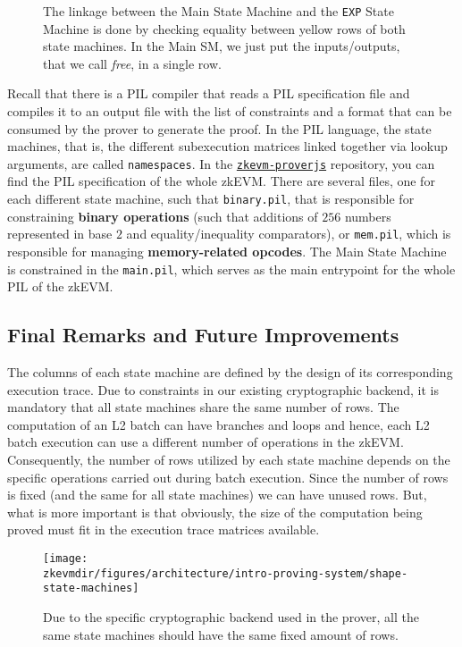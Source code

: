 \begin{figure}[ht]
\caption{The linkage between the Main State Machine and the \texttt{EXP} State Machine is done by checking equality between yellow rows of both state machines. In the Main SM, we just put the inputs/outputs, that we call \textit{free}, in a single row.}
\label{fig:lookup-exp}

\end{figure}

Recall that there is a PIL compiler that reads a PIL specification file and compiles it to an output file with the list of constraints and a format that can be consumed by the prover to generate the proof. In the PIL language, the state machines, that is, the different subexecution matrices linked together via lookup arguments, are called \texttt{namespaces}. In the \href{https://github.com/0xPolygonHermez/zkevm-proverjs}{\texttt{zkevm-proverjs}} repository, you can find the PIL specification of the whole zkEVM. There are several files, one for each different state machine, such that \texttt{binary.pil}, that is responsible for constraining \textbf{binary operations} (such that additions of $256$ numbers represented in base $2$ and equality/inequality comparators), or \texttt{mem.pil}, which is responsible for managing \textbf{memory-related opcodes}. The Main State Machine is constrained in the \texttt{main.pil}, which serves as the main entrypoint for the whole PIL of the zkEVM.

\subsection{Final Remarks and Future Improvements}

The columns of each state machine are defined by the design of its corresponding
execution trace. Due to constraints in our existing cryptographic backend, it is mandatory that all state machines share the same number of rows. The computation of an L2 batch can have branches and loops and hence, each L2 batch execution can use a different number of operations in the zkEVM.  Consequently, the number of rows utilized by each state machine depends on the specific operations carried out during batch execution. Since the number of rows is fixed (and the same for all state machines) we can have unused rows. But, what is more important is that obviously, the size of the computation being proved must fit in the execution trace matrices available.

\begin{figure}[ht]
\centering
\texttt{[image: \\zkevmdir/figures/architecture/intro-proving-system/shape-state-machines]}
\caption{Due to the specific cryptographic backend used in the prover, all the same state machines should have the same fixed amount of rows. }
\label{fig:several-sm-rows}

\end{figure}

